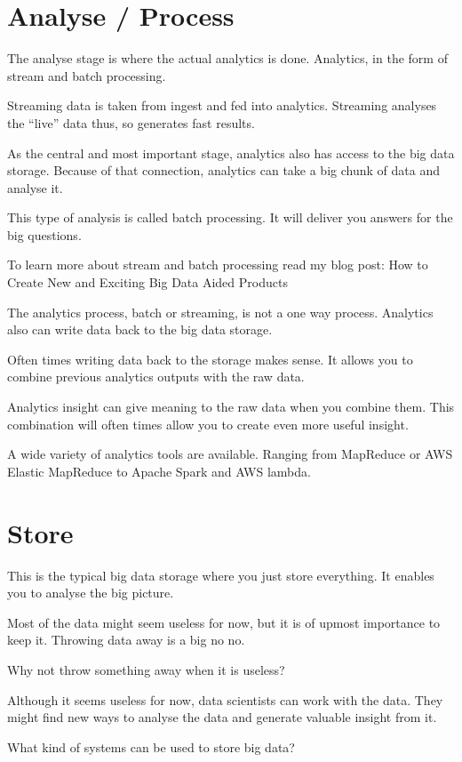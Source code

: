 \documentclass[12pt, numbers=noenddot]{scrreprt} %
\begin{document}
\section{Analyse / Process}
The analyse stage is where the actual analytics is done. Analytics, in the form of stream and batch processing.

Streaming data is taken from ingest and fed into analytics. Streaming analyses the “live” data thus, so generates fast results.

As the central and most important stage, analytics also has access to the big data storage. Because of that connection, analytics can take a big chunk of data and analyse it.

This type of analysis is called batch processing. It will deliver you answers for the big questions.

To learn more about stream and batch processing read my blog post: How to Create New and Exciting Big Data Aided Products

The analytics process, batch or streaming, is not a one way process. Analytics also can write data back to the big data storage.

Often times writing data back to the storage makes sense. It allows you to combine previous analytics outputs with the raw data.

Analytics insight can give meaning to the raw data when you combine them. This combination will often times allow you to create even more useful insight.

A wide variety of analytics tools are available. Ranging from MapReduce or AWS Elastic MapReduce to Apache Spark and AWS lambda.

\section{Store}
This is the typical big data storage where you just store everything. It enables you to analyse the big picture.

Most of the data might seem useless for now, but it is of upmost importance to keep it. Throwing data away is a big no no.

Why not throw something away when it is useless?

Although it seems useless for now, data scientists can work with the data. They might find new ways to analyse the data and generate valuable insight from it.

What kind of systems can be used to store big data?
\end{document}

